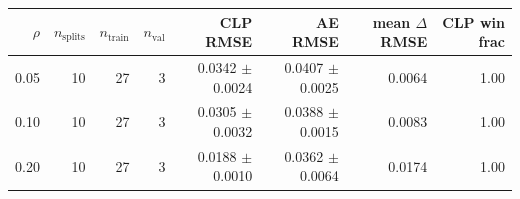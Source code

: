 \begin{tabular}{rrrrrrrr}
\toprule
$\rho$ & $n_{\mathrm{splits}}$ & $n_{\mathrm{train}}$ & $n_{\mathrm{val}}$ & CLP RMSE & AE RMSE & mean $\Delta$RMSE & CLP win frac \\
\midrule
0.05 & 10 & 27 & 3 & 0.0342 $\pm$ 0.0024 & 0.0407 $\pm$ 0.0025 & 0.0064 & 1.00 \\
0.10 & 10 & 27 & 3 & 0.0305 $\pm$ 0.0032 & 0.0388 $\pm$ 0.0015 & 0.0083 & 1.00 \\
0.20 & 10 & 27 & 3 & 0.0188 $\pm$ 0.0010 & 0.0362 $\pm$ 0.0064 & 0.0174 & 1.00 \\
\bottomrule
\end{tabular}
